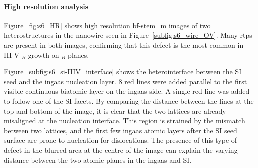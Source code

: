 \paragraph{High resolution analysis} Figure~\ref{fig:s6_HR} shows high resolution \acs{bf}-\acs{stem_m} images of two heterostructures in the nanowire seen in Figure~\ref{subfig:s6_wire_OV}. Many \acs{rtp}s are present in both images, confirming that this defect is the most common in III-V \(_B\) growth on \(_B\) planes. 

Figure~\ref{subfig:s6_si-IIIV_interface} shows the heterointerface between the \acl{SI} seed and the \acs{ingaas} nucleation layer. \num{8} red lines were added parallel to the first visible continuous biatomic layer on the \acs{ingaas} side. A single red line was added to follow one of the \acs{SI}  facets. By comparing the distance between the lines at the top and bottom of the image, it is clear that the two lattices are already misaligned at the nucleation interface. This region is strained by the mismatch between two lattices, and the first few \acs{ingaas} atomic layers after the \acl{SI} seed surface are prone to nucleation for dislocations. The presence of this type of defect in the blurred area at the centre of the image can explain the varying distance between the two  atomic planes in the \acs{ingaas} and \acl{SI}.

